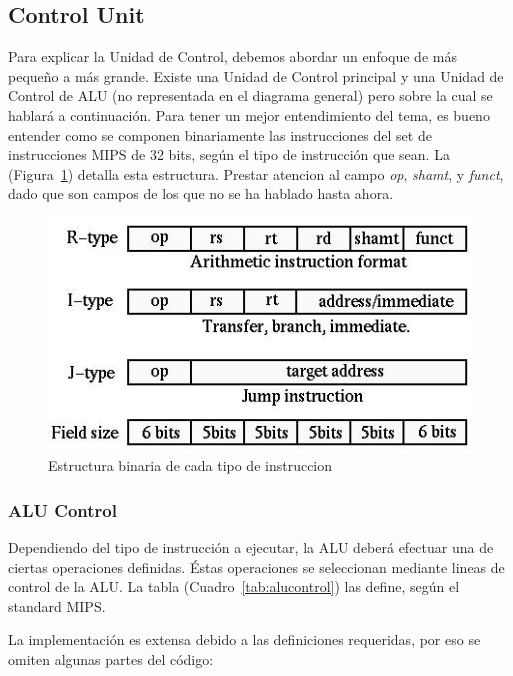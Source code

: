 \documentclass[12pt]{article}
\begin{document}
\subsection{Control Unit}

Para explicar la Unidad de Control, debemos abordar un enfoque de más pequeño a más grande. Existe una Unidad de Control principal y una Unidad de Control de ALU (no representada en el diagrama general) pero sobre la cual se hablará a continuación. Para tener un mejor entendimiento del tema, es bueno entender como se componen binariamente las instrucciones del set de instrucciones MIPS de 32 bits, según el tipo de instrucción que sean. La (Figura~\ref{fig:instrucciones}) detalla esta estructura. Prestar atencion al campo \textit{op}, \textit{shamt}, y \textit{funct}, dado que son campos de los que no se ha hablado hasta ahora.

\begin{figure}[ht]
\centering
\hspace*{-1cm}
\includegraphics[width=.5\textwidth]{imagenes/estructura_instrucciones.jpeg}
\caption{Estructura binaria de cada tipo de instruccion \cite{patterson}}
\label{fig:instrucciones}
\end{figure}

\subsubsection{ALU Control}

Dependiendo del tipo de instrucción a ejecutar, la ALU deberá efectuar una de ciertas operaciones definidas. Éstas operaciones se seleccionan mediante lineas de control de la ALU. La tabla (Cuadro~\ref{tab:alucontrol}) las define, según el standard MIPS.

La implementación es extensa debido a las definiciones requeridas, por eso se omiten algunas partes del código:
\end{document}
